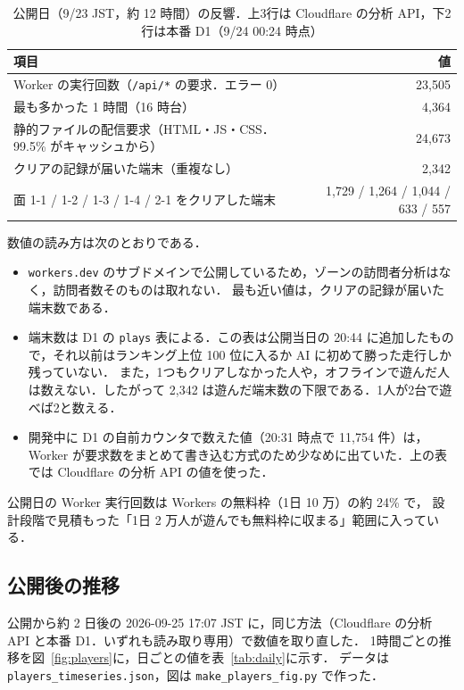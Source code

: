 \documentclass[a4paper,10pt]{ltjsarticle}
\newcommand{\figref}[1]{図~\ref{#1}}
\newcommand{\tabref}[1]{表~\ref{#1}}
\newcommand{\code}[1]{\texttt{#1}}
\begin{document}
\begin{table}[H]
\centering
\caption{公開日（9/23 JST，約 12 時間）の反響．上3行は Cloudflare の分析 API，下2行は本番 D1（9/24 00:24 時点）}
\label{tab:reception}
\small
\begin{tabular}{lr}
\toprule
項目 & 値 \\
\midrule
Worker の実行回数（\code{/api/*} の要求．エラー 0） & 23,505 \\
\quad 最も多かった 1 時間（16 時台） & 4,364 \\
静的ファイルの配信要求（HTML・JS・CSS．99.5\% がキャッシュから） & 24,673 \\
クリアの記録が届いた端末（重複なし） & 2,342 \\
面 1-1 / 1-2 / 1-3 / 1-4 / 2-1 をクリアした端末 & 1,729 / 1,264 / 1,044 / 633 / 557 \\
\bottomrule
\end{tabular}
\end{table}

数値の読み方は次のとおりである．
\begin{itemize}
  \item \texttt{workers.dev} のサブドメインで公開しているため，ゾーンの訪問者分析はなく，訪問者数そのものは取れない．
  最も近い値は，クリアの記録が届いた端末数である．
  \item 端末数は D1 の \code{plays} 表による．この表は公開当日の 20:44 に追加したもので，それ以前はランキング上位 100 位に入るか AI に初めて勝った走行しか残っていない．
  また，1つもクリアしなかった人や，オフラインで遊んだ人は数えない．したがって 2,342 は遊んだ端末数の下限である．1人が2台で遊べば2と数える．
  \item 開発中に D1 の自前カウンタで数えた値（20:31 時点で 11,754 件）は，Worker が要求数をまとめて書き込む方式のため少なめに出ていた．上の表では Cloudflare の分析 API の値を使った．
\end{itemize}

公開日の Worker 実行回数は Workers の無料枠（1日 10 万）の約 24\% で，
設計段階で見積もった「1日 2 万人が遊んでも無料枠に収まる」範囲に入っている．

\subsection{公開後の推移}
\label{sec:decay}
公開から約 2 日後の 2026-09-25 17:07 JST に，同じ方法（Cloudflare の分析 API と本番 D1．いずれも読み取り専用）で数値を取り直した．
1時間ごとの推移を\figref{fig:players}に，日ごとの値を\tabref{tab:daily}に示す．
データは \code{players\_timeseries.json}，図は \code{make\_players\_fig.py} で作った．
\end{document}
